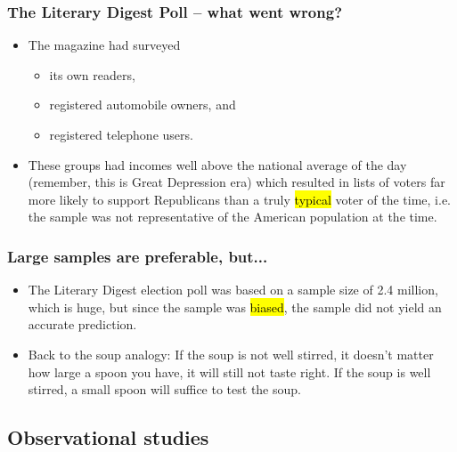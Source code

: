 \documentclass[slidestop,compress,mathserif]{beamer}
\begin{document}

\begin{frame}
	\frametitle{The Literary Digest Poll -- what went wrong?}

	\begin{itemize}
		\item The magazine had surveyed
		\begin{itemize}
			\item its own readers,
			\item registered automobile owners, and
			\item registered telephone users.
		\end{itemize}
		\item These groups had incomes well above the national average of the day (remember, this is Great Depression era) which resulted in lists of voters far more likely to support Republicans than a truly \hl{typical} voter of the time, i.e. the sample was not representative of the American population at the time.
	\end{itemize}

\end{frame}


\begin{frame}

	\frametitle{Large samples are preferable, but...}

	\begin{itemize}
		\item The Literary Digest election poll was based on a sample size of 2.4 million, which is huge, but since the sample was \hl{biased}, the sample did not yield an accurate prediction.
		\item Back to the soup analogy: If the soup is not well stirred, it doesn't matter how large a spoon you have, it will still not taste right. If the soup is well stirred, a small spoon will suffice to test the soup.
	\end{itemize}

\end{frame}


\subsection{Observational studies}

\end{document}
